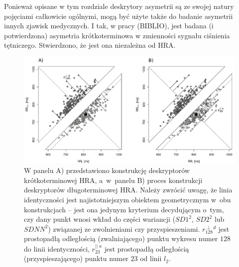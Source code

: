 Ponieważ opisane w tym rozdziale deskrytory asymetrii są ze swojej natury pojęciami
całkowicie ogólnymi, mogą być użyte także do badanie asymetrii innych zjawisk medycznych.
I tak, w pracy (BIBLIO), jest badana (i potwierdzona) asymetria krótkoterminowa w zmienności
sygnału ciśnienia tętniczego. Stwierdzono, że jest ona niezależna od HRA.
\begin{landscape}
\begin{figure}
\begin{center}
\includegraphics[width=1.5\textwidth]{graph/habfig2_2a}
\caption{W panelu A) przedstawiono konstrukcję deskryptorów krótkoterminowej HRA, a~w~panelu B) proces konstrukcji deskryptorów długoterminowej HRA. Należy zwrócić uwagę, że linia identyczności jest najistotniejszym obiektem geometrycznym w~obu konstrukcjach -- jest ona jedynym kryterium decydującym o~tym, czy dany punkt wnosi wkład do części wariancji ($SD1^2$, $SD2^2$ lub $SDNN^2$) związanej ze zwolnieniami czy przyspieszeniami. $r^{\perp\;d}_{128}$ jest prostopadłą odległością (zwalniającego) punktu wykresu \PP{} numer $128$ do linii identyczności, $r^{||\;a}_{23}$ jest prostopadłą odległością (przyspieszającego) punktu numer $23$ od linii $l_{2}$.\label{habfig2_2}}
\end{center}
\end{figure}
\end{landscape}
\clearpage
